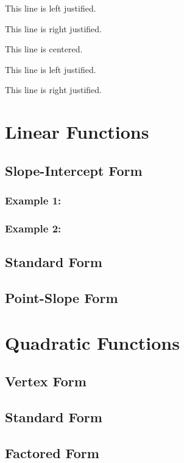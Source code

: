 \documentclass[12pt]{article}
\begin{document}
\begin{flushleft}This line is left justified.\end{flushleft}

\begin{flushright}This line is right justified.\end{flushright}


\tiny
This line is centered.

This line is left justified.

This line is right justified.

\section{Linear Functions}
	\subsection{Slope-Intercept Form}
		\subsubsection{Example 1:}
		\subsubsection{Example 2:}
	\subsection{Standard Form}
	\subsection{Point-Slope Form}
\section{Quadratic Functions}
	\subsection{Vertex Form}
	\subsection{Standard Form}
	\subsection{Factored Form}
\end{document}
